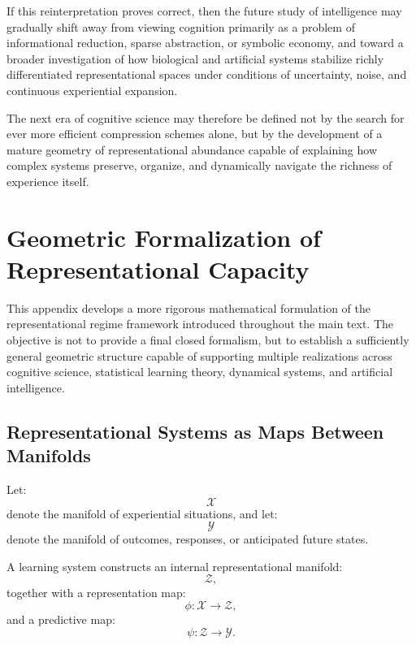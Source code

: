 \documentclass[12pt,a4paper]{article}
\begin{document}
If this reinterpretation proves correct, then the future study of intelligence may gradually shift away from viewing cognition primarily as a problem of informational reduction, sparse abstraction, or symbolic economy, and toward a broader investigation of how biological and artificial systems stabilize richly differentiated representational spaces under conditions of uncertainty, noise, and continuous experiential expansion.

The next era of cognitive science may therefore be defined not by the search for ever more efficient compression schemes alone, but by the development of a mature geometry of representational abundance capable of explaining how complex systems preserve, organize, and dynamically navigate the richness of experience itself.

\newpage


\appendix

\section{Geometric Formalization of Representational Capacity}

This appendix develops a more rigorous mathematical formulation of the representational regime framework introduced throughout the main text. The objective is not to provide a final closed formalism, but to establish a sufficiently general geometric structure capable of supporting multiple realizations across cognitive science, statistical learning theory, dynamical systems, and artificial intelligence.

\subsection{Representational Systems as Maps Between Manifolds}

Let:
\[
\mathcal{X}
\]
denote the manifold of experiential situations,
and let:
\[
\mathcal{Y}
\]
denote the manifold of outcomes, responses, or anticipated future states.

A learning system constructs an internal representational manifold:
\[
\mathcal{Z},
\]
together with a representation map:
\[
\phi :
\mathcal{X}
\rightarrow
\mathcal{Z},
\]
and a predictive map:
\[
\psi :
\mathcal{Z}
\rightarrow
\mathcal{Y}.
\]
\end{document}
